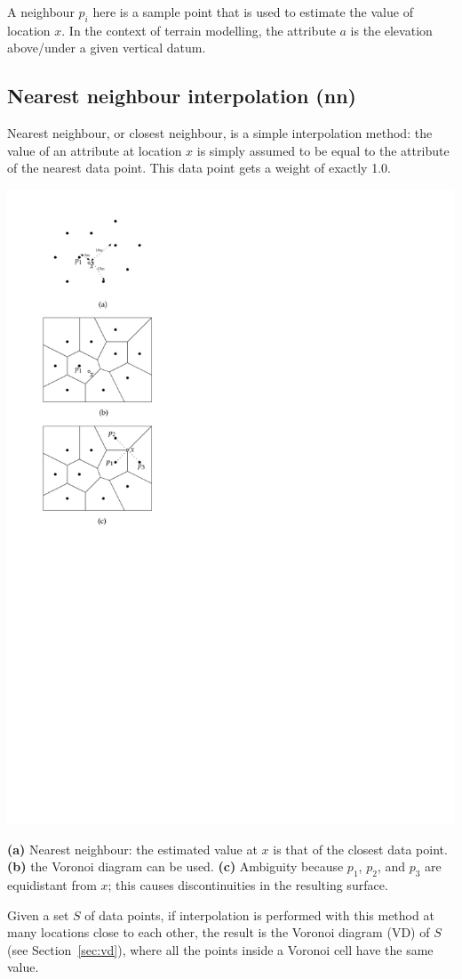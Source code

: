 A neighbour $p_i$ here is a sample point that is used to estimate the value of location $x$.
In the context of terrain modelling, the attribute $a$ is the elevation above/under a given vertical datum.


\subsection{Nearest neighbour interpolation (\textbf{nn})}%

Nearest neighbour, or closest neighbour, is a simple interpolation method: the value of an attribute at location $x$ is simply assumed to be equal to the attribute of the nearest data point. 
This data point gets a weight of exactly 1.0.
\begin{marginfigure}
  \centering
  \includegraphics[width=0.8\linewidth]{figs/cn}
  \caption{\textbf{(a)} Nearest neighbour: the estimated value at $x$ is that of the closest data point. \textbf{(b)} the Voronoi diagram can be used. \textbf{(c)} Ambiguity because $p_1$, $p_2$, and $p_3$ are equidistant from $x$; this causes discontinuities in the resulting surface.}%
\end{marginfigure}
Given a set $S$ of data points, if interpolation is performed with this method at many locations close to each other, the result is the Voronoi diagram (VD) of $S$ (see Section~\ref{sec:vd}), where all the points inside a Voronoi cell have the same value.

